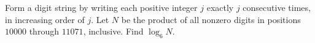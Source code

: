 Form a digit string by writing each positive integer $j$ exactly $j$ consecutive times, in increasing order of $j$. Let $N$ be the product of all nonzero digits in positions $10000$ through $11071$, inclusive. Find $\log_6N$.
